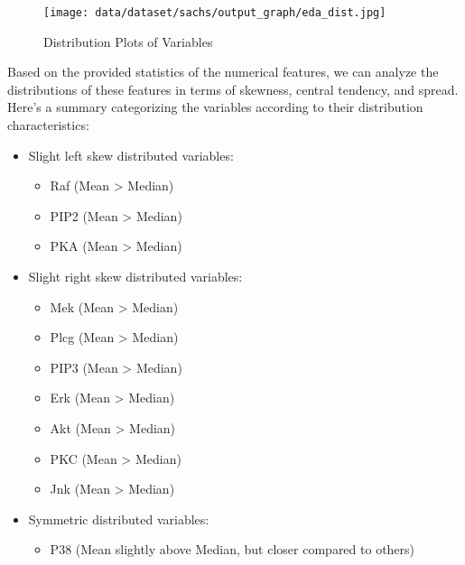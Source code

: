\documentclass{article}
\begin{document}
\begin{figure}[H]
\centering
\texttt{[image: data/dataset/sachs/output\_graph/eda\_dist.jpg]}
\caption{\label{fig:dist}Distribution Plots of Variables}
\end{figure}

Based on the provided statistics of the numerical features, we can analyze the distributions of these features in terms of skewness, central tendency, and spread. Here’s a summary categorizing the variables according to their distribution characteristics:

\begin{itemize}
\item Slight left skew distributed variables: 
\begin{itemize}
    \item Raf (Mean > Median)
    \item PIP2 (Mean > Median)
    \item PKA (Mean > Median)
\end{itemize}

\item Slight right skew distributed variables: 
\begin{itemize}
    \item Mek (Mean > Median)
    \item Plcg (Mean > Median)
    \item PIP3 (Mean > Median)
    \item Erk (Mean > Median)
    \item Akt (Mean > Median)
    \item PKC (Mean > Median)
    \item Jnk (Mean > Median)
\end{itemize}

\item Symmetric distributed variables: 
\begin{itemize}
    \item P38 (Mean slightly above Median, but closer compared to others)
\end{itemize}

\end{itemize}
\end{document}
